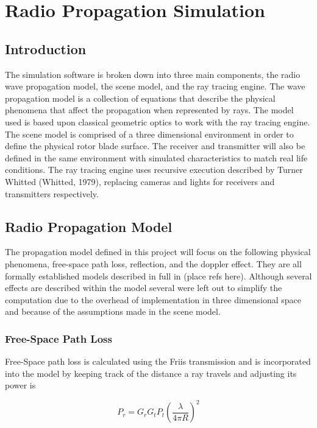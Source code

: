 \chapter{Radio Propagation Simulation}

\section{Introduction}
The simulation software is broken down into three main components, the radio wave propagation model, the scene model, and the ray tracing engine. The wave propagation model is a collection of equations that describe the physical phenomena that affect the propagation when represented by rays. The model used is based upon classical geometric optics to work with the ray tracing engine. The scene model is comprised of a three dimensional environment in order to define the physical rotor blade surface. The receiver and transmitter will also be defined in the same environment with simulated characteristics to match real life conditions. The ray tracing engine uses recursive execution described by Turner Whitted (Whitted, 1979), replacing cameras and lights for receivers and transmitters respectively.

\section{Radio Propagation Model}
The propagation model defined in this project will focus on the following physical phenomena, free-space path loss, reflection, and the doppler effect. They are all formally established models described in full in (place refs here). Although several effects are described within the model several were left out to simplify the computation due to the overhead of implementation in three dimensional space and because of the assumptions made in the scene model.

\subsection{Free-Space Path Loss}
Free-Space path loss is calculated using the Friis transmission and is incorporated into the model by keeping track of the distance a ray travels and adjusting its power is

\begin{equation}
	 P_r = G_r G_t P_t \left (\frac{\lambda}{4\pi R}\right)^2
	 \label{eqn:FSPL}
\end{equation}

